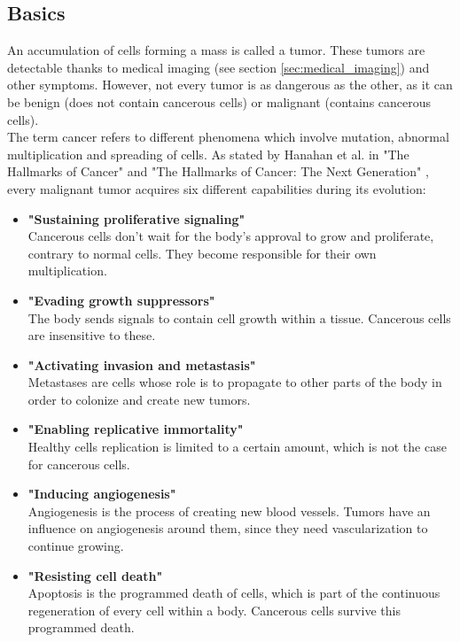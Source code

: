 \subsection{Basics}
\setlength{\marginparwidth}{3cm}\leavevmode {}An accumulation of cells forming a mass is called a tumor. These tumors are detectable thanks to medical imaging (see section \ref{sec:medical_imaging}) and other symptoms. However, not every tumor is as dangerous as the other, as it can be benign (does not contain cancerous cells) or malignant (contains cancerous cells).\\
The term cancer refers to different phenomena which involve mutation, abnormal multiplication and spreading of cells. As stated by Hanahan et al. in "The Hallmarks of Cancer" \cite{19} and "The Hallmarks of Cancer: The Next Generation" \cite{20}, every malignant tumor acquires six different capabilities during its evolution: 
\begin{itemize}
	\item \textbf{"Sustaining proliferative signaling"}\\ Cancerous cells don't wait for the body's approval to grow and proliferate, contrary to normal cells. They become responsible for their own multiplication.
	\item \textbf{"Evading growth suppressors"}\\
The body sends signals to contain cell growth within a tissue. Cancerous cells are insensitive to these. 
	\item \textbf{"Activating invasion and metastasis"}\\
Metastases are cells whose role is to propagate to other parts of the body in order to colonize and create new tumors. 
	\item \textbf{"Enabling replicative immortality"}\\
Healthy cells replication is limited to a certain amount, which is not the case for cancerous cells. 
	\item \textbf{"Inducing angiogenesis"}
\\Angiogenesis is the process of creating new blood vessels. Tumors have an influence on angiogenesis around them, since they need vascularization to continue growing. 
	\item \textbf{"Resisting cell death"}
\\Apoptosis is the programmed death of cells, which is part of the continuous regeneration of every cell within a body. Cancerous cells survive this programmed death. 
\end{itemize}


